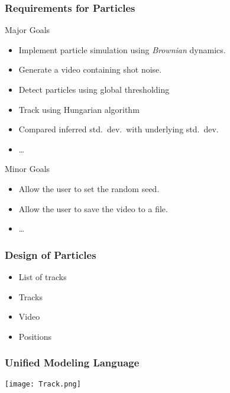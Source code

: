 \begin{frame}[fragile]
\frametitle{Requirements for Particles}

\begin{block}{Major Goals}


\begin{itemize}
\item Implement particle simulation using \textit{Brownian} dynamics.
\item Generate a video containing shot noise.
\item Detect particles using global thresholding
\item Track using Hungarian algorithm
\item Compared inferred std.\ dev.\ with underlying std.\ dev.
\item \ldots
\end{itemize}
\end{block}
\begin{block}{Minor Goals}

\begin{itemize}
\item Allow the user to set the random seed.
\item Allow the user to save the video to a file.
\item \ldots
\end{itemize}
\end{block}
\end{frame}

\begin{frame}[fragile]
\frametitle{Design of Particles}

\begin{itemize}
\item List of tracks
\item Tracks
\item Video
\item Positions
\end{itemize}
\end{frame}

\begin{frame}[fragile]
\frametitle{Unified Modeling Language}

\centering
\texttt{[image: Track.png]}

\end{frame}

